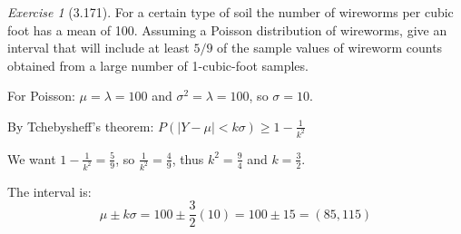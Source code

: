 \documentclass[12pt]{amsart}
\makeatletter
\theoremstyle{remark}
\newtheorem*{exercise}{Exercise}%
\renewenvironment{proof}[1][\proofname]{\par\doublespacing
  \pushQED{\qed}%
  \normalfont \topsep6\p@\@plus6\p@\relax
  \list{}{%
    \settowidth{\leftmargin}{\itshape\proofname:\hskip\labelsep}%
    \setlength{\labelwidth}{0pt}%
    \setlength{\itemindent}{-\leftmargin}%
  }%
  \item[\hskip\labelsep\itshape#1\@addpunct{:}]\ignorespaces
}{%
  \popQED\endlist\@endpefalse
  \singlespacing
}
\theoremstyle{mycomment}
\makeatother
\begin{document}
\begin{exercise}[3.171]
For a certain type of soil the number of wireworms per cubic foot has a mean of 100. Assuming a Poisson distribution of wireworms, give an interval that will include at least $5/9$ of the sample values of wireworm counts obtained from a large number of 1-cubic-foot samples.

\begin{proof}[Solution]
 For Poisson: $\mu = \lambda = 100$ and $\sigma^2 = \lambda = 100$, so $\sigma = 10$.
	
	By Tchebysheff's theorem: $P(|Y - \mu| < k\sigma) \geq 1 - \frac{1}{k^2}$
	
	We want $1 - \frac{1}{k^2} = \frac{5}{9}$, so $\frac{1}{k^2} = \frac{4}{9}$, thus $k^2 = \frac{9}{4}$ and $k = \frac{3}{2}$.
	
	The interval is:
	$$\mu \pm k\sigma = 100 \pm \frac{3}{2}(10) = 100 \pm 15 = (85, 115)$$
\end{proof}
\end{exercise}
\end{document}
